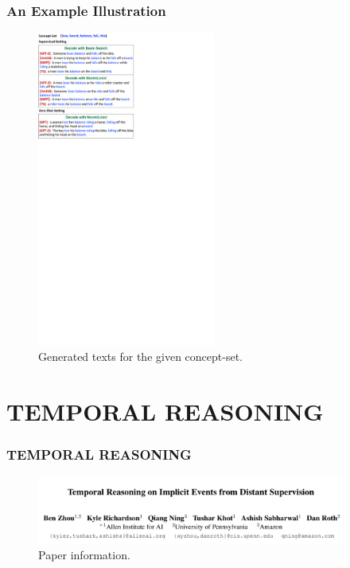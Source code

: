 \documentclass[10pt,aspectratio=43]{beamer}
\begin{document}
     \begin{frame}
        \frametitle{\textbf{An Example Illustration}}
        \begin{figure}[!t]
            \centering
            \includegraphics[width=2.3in]{figures/example1.pdf}
            \caption{Generated texts for the given concept-set.}
            \label{fig:examples1}
        \end{figure}
    \end{frame}
    
\section[Temporal Reasoning]{TEMPORAL REASONING}
    \begin{frame}
        \frametitle{\textbf{TEMPORAL REASONING}}
        \begin{figure}
            \centering
            \includegraphics[width=4in]{figures/temporal_reasoning_info.png}
            \caption{Paper information. \cite{zhou_temporal_2021} }
            \label{fig:temporal-reasoning-info}
        \end{figure}
	\end{frame}
	
\end{document}
